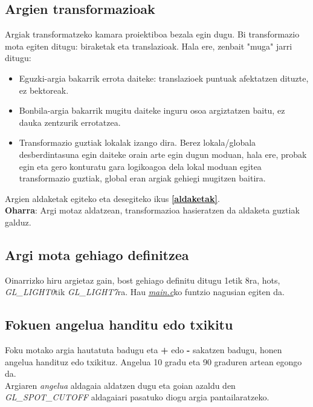 \documentclass[12pt]{article}
\newcommand{\fitxategi}[1] {\underline{\textit{#1}}}
\newcommand{\aldagai}[1] {\textit{#1}}
\newcommand{\tekla}[1] {\textbf{#1}}
\newcommand{\erref}[1] {\textbf{\ref{#1}}}
\begin{document}
\subsection{Argien transformazioak}

Argiak transformatzeko kamara proiektiboa bezala egin dugu. Bi transformazio mota egiten ditugu: biraketak eta translazioak. Hala ere, zenbait "muga" jarri ditugu:

\begin{itemize}
\item Eguzki-argia bakarrik errota daiteke: translazioek puntuak afektatzen dituzte, ez bektoreak.

\item Bonbila-argia bakarrik mugitu daiteke inguru osoa argiztatzen baitu, ez dauka zentzurik errotatzea.

\item Transformazio guztiak lokalak izango dira. Berez lokala/globala desberdintasuna egin daiteke orain arte egin dugun moduan, hala ere, probak egin eta gero konturatu gara logikoagoa dela lokal moduan egitea transformazio guztiak, global eran argiak gehiegi mugitzen baitira.

\end{itemize}

Argien aldaketak egiteko eta desegiteko ikus \erref{aldaketak}.\\

\textbf{Oharra}: Argi motaz aldatzean, transformazioa hasieratzen da aldaketa guztiak galduz.

\subsection{Argi mota gehiago definitzea}

Oinarrizko hiru argietaz gain, bost gehiago definitu ditugu 1etik 8ra, hots, \aldagai{GL\_LIGHT0}tik \aldagai{GL\_LIGHT7}ra. Hau \fitxategi{main.c}ko funtzio nagusian egiten da.

\subsection{Fokuen angelua handitu edo txikitu}

Foku motako argia hautatuta badugu eta \tekla{+} edo \tekla{-} sakatzen badugu, honen angelua handituz edo txikituz. Angelua 10 gradu eta 90 graduren artean egongo da.\\

Argiaren \aldagai{angelua} aldagaia aldatzen dugu eta goian azaldu den \aldagai{GL\_SPOT\_CUTOFF} aldagaiari pasatuko diogu argia pantailaratzeko.\\
\end{document}
